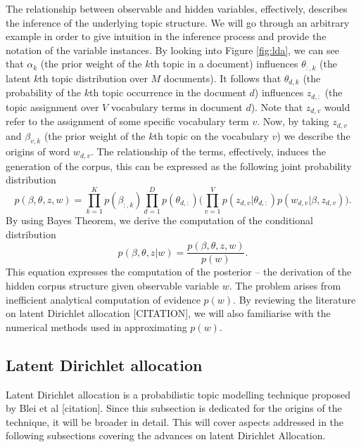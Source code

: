 \documentclass{mprop}
\begin{document}
\par The relationship between observable and hidden variables, effectively, describes the inference of the underlying topic structure. We will go through an arbitrary example in order to give intuition in the inference process and provide the notation of the variable instances. By looking into Figure \ref{fig:lda}, we can see that $\alpha_k$ (the prior weight of the $k$th topic in a document) influences $\theta_{:, k}$ (the latent $k$th topic distribution over $M$ documents). It follows that $\theta_{d, k}$ (the probability of the $k$th topic occurrence in the document $d$) influences $z_{d, :}$ (the topic assignment over $V$ vocabulary terms in document $d$). Note that $z_{d, v}$ would refer to the assignment of some specific vocabulary term $v$. Now, by taking $z_{d, v}$ and $\beta_{v, k}$ (the prior weight of the $k$th topic on the vocabulary $v$) we describe the origins of word $w_{d, v}$. The relationship of the terms, effectively, induces the generation of the corpus, this can be expressed as the following joint probability distribution
\begin{equation}
p(\beta, \theta, z, w) = \prod_{k=1}^Kp(\beta_{:, k})\prod_{d=1}^Dp(\theta_{d, :})\bigg(\prod_{v=1}^Vp(z_{d, v} | \theta_{d, :})p(w_{d, v} | \beta, z_{d, v})\bigg).
\end{equation}
By using Bayes Theorem, we derive the computation of the conditional distribution
\begin{equation}
p(\beta, \theta, z | w) = \frac{p(\beta, \theta, z, w)}{p(w)}. 
\end{equation}
This equation expresses the computation of the posterior -- the derivation of the hidden corpus structure given observable variable $w$. The problem arises from inefficient analytical computation of evidence $p(w)$. By reviewing the literature on latent Dirichlet allocation [CITATION], we will also familiarise with the numerical methods used in approximating $p(w)$.

\subsection{Latent Dirichlet allocation}

\par Latent Dirichlet allocation is a probabilistic topic modelling technique  proposed by Blei et al [citation]. Since this subsection is dedicated for the origins of the technique, it will be broader in detail. This will cover aspects addressed in the following subsections covering the advances on latent Dirichlet Allocation. 
\end{document}
